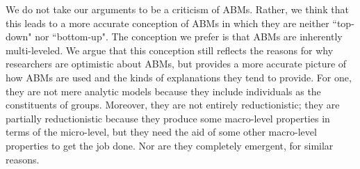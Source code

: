 \documentclass[11pt]{article}
\begin{document}
We do not take our arguments to be a criticism of ABMs. Rather, we think that this leads to a more accurate conception of ABMs in which they are neither ``top-down" nor ``bottom-up". The conception we prefer is that ABMs are inherently multi-leveled.  We argue that this conception still reflects the reasons for why researchers are optimistic about ABMs, but provides a more accurate picture of how ABMs are used and the kinds of explanations they tend to provide.  For one, they are not mere analytic models because they include individuals as the constituents of groups. Moreover, they are not entirely reductionistic; they are partially reductionistic because they produce some macro-level properties in terms of the micro-level, but they need the aid of some other macro-level properties to get the job done. Nor are they completely emergent, for similar reasons.
\end{document}
